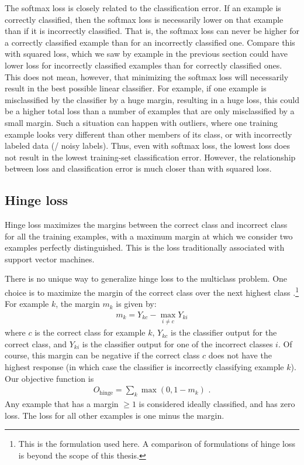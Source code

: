 The softmax loss is closely related to the classification error.
If an example is correctly classified,
then the softmax loss is necessarily lower on that example
than if it is incorrectly classified.
That is, the softmax loss can never be higher for a correctly classified example
than for an incorrectly classified one.
Compare this with squared loss,
which we saw by example in the previous section could have lower loss
for incorrectly classified examples than for correctly classified ones.
This does not mean, however, that minimizing the softmax loss
will necessarily result in the best possible linear classifier.
For example, if one example is misclassified by the classifier by a huge margin,
resulting in a huge loss,
this could be a higher total loss than a number of examples
that are only misclassified by a small margin.
Such a situation can happen with outliers,
where one training example looks very different than other members of its class,
or with incorrectly labeled data (\ie/ noisy labels).
Thus, even with softmax loss,
the lowest loss does not result in the lowest training-set classification error.
However, the relationship between loss and classification error
is much closer than with squared loss.


\subsection{Hinge loss}

Hinge loss maximizes the margins between the correct class and incorrect class
for all the training examples,
with a maximum margin at which we consider two examples perfectly distinguished.
This is the loss traditionally associated with support vector machines.

There is no unique way to generalize hinge loss to the multiclass problem.
One choice is to maximize the margin of the correct class
over the next highest class \parencite{Crammer2001}.\footnote{
  This is the formulation used here.
  A comparison of formulations of hinge loss is beyond the scope of this thesis.}
For example $k$, the margin $m_k$ is given by:
\begin{align}
  m_k = Y_{kc} - \max_{i \ne c} Y_{ki}
\end{align}
where $c$ is the correct class for example $k$,
$Y_{kc}$ is the classifier output for the correct class,
and $Y_{ki}$ is the classifier output for one of the incorrect classes $i$.
Of course, this margin can be negative if the correct class $c$
does not have the highest response
(in which case the classifier is incorrectly classifying example $k$).
Our objective function is
\begin{align}
  O_\text{hinge} = \sum_k \max\left(0, 1 - m_k\right) \text{ .}
\end{align}
Any example that has a margin $\ge 1$ is considered ideally classified,
and has zero loss.
The loss for all other examples is one minus the margin.

